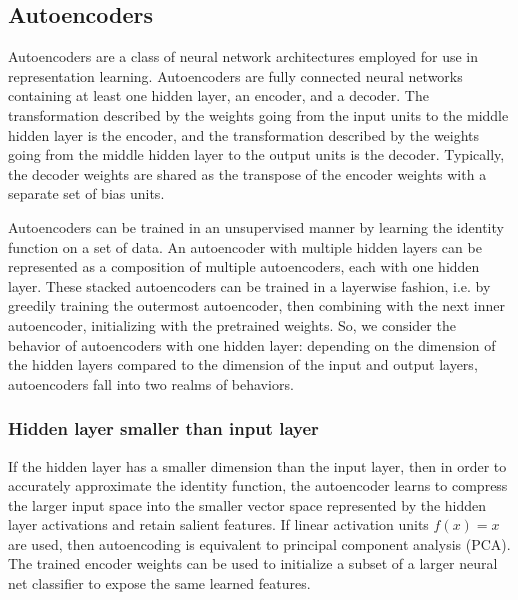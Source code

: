 \documentclass{article} %
\begin{document}

\subsection{Autoencoders}
Autoencoders are a class of neural network architectures employed for use in representation learning. Autoencoders are fully connected neural networks containing at least one hidden layer, an encoder, and a decoder. The transformation described by the weights going from the input units to the middle hidden layer is the encoder, and the transformation described by the weights going from the middle hidden layer to the output units is the decoder. Typically, the decoder weights are shared as the transpose of the encoder weights with a separate set of bias units.

Autoencoders can be trained in an unsupervised manner by learning the identity function on a set of data. An autoencoder with multiple hidden layers can be represented as a composition of multiple autoencoders, each with one hidden layer. These stacked autoencoders can be trained in a layerwise fashion, i.e. by greedily training the outermost autoencoder, then combining with the next inner autoencoder, initializing with the pretrained weights. So, we consider the behavior of autoencoders with one hidden layer: depending on the dimension of the hidden layers compared to the dimension of the input and output layers, autoencoders fall into two realms of behaviors.

\subsubsection{Hidden layer smaller than input layer}
If the hidden layer has a smaller dimension than the input layer, then in order to accurately approximate the identity function, the autoencoder learns to compress the larger input space into the smaller vector space represented by the hidden layer activations and retain salient features. If linear activation units $f(x) = x$ are used, then autoencoding is equivalent to principal component analysis (PCA). The trained encoder weights can be used to initialize a subset of a larger neural net classifier to expose the same learned features.
\end{document}
